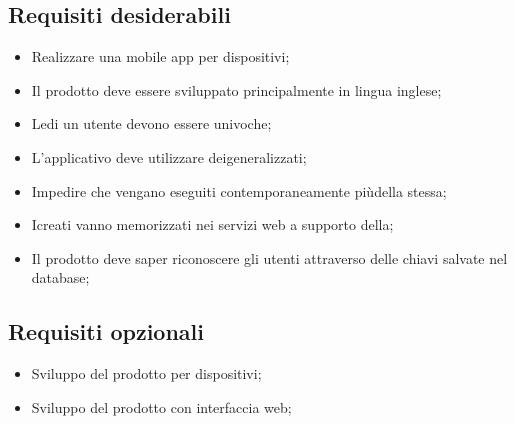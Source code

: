 \subsection{Requisiti desiderabili}
\begin{itemize}
	\item Realizzare una mobile app per dispositivi;
	\item Il prodotto deve essere sviluppato principalmente in lingua inglese;
	\item Ledi un utente devono essere univoche;
	\item L'applicativo deve utilizzare deigeneralizzati;
	\item Impedire che vengano eseguiti contemporaneamente piùdella stessa;
	\item Icreati vanno memorizzati nei servizi web a supporto della;
	\item Il prodotto deve saper riconoscere gli utenti attraverso delle chiavi salvate nel database;
\end{itemize}
\subsection{Requisiti opzionali}
\begin{itemize}
	\item Sviluppo del prodotto per dispositivi;
	\item Sviluppo del prodotto con interfaccia web;
\end{itemize}